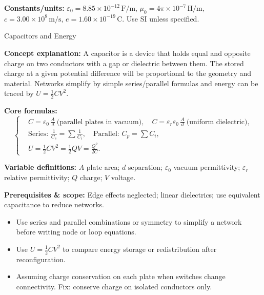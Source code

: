 \begin{insightbox}
\textbf{Constants/units:} $\varepsilon_0=8.85\times10^{-12}\,\mathrm{F/m}$, $\mu_0=4\pi\times10^{-7}\,\mathrm{H/m}$, $c=3.00\times10^8\,\mathrm{m/s}$, $e=1.60\times10^{-19}\,\mathrm{C}$. Use SI unless specified.
\end{insightbox}


\begin{KnowledgePoint}{Capacitors and Energy \Core}
  \KPFormulas
  \begin{formulabox}
  \textbf{Concept explanation:} A capacitor is a device that holds equal and opposite charge on two conductors with a gap or dielectric between them. The stored charge at a given potential difference will be proportional to the geometry and material. Networks simplify by simple series/parallel formulas and energy can be traced by $U=\tfrac12 C V^2$.

  \textbf{Core formulas:}
  \[
  \left\{\begin{aligned}
    &C=\varepsilon_0\,\frac{A}{d}\ \text{(parallel plates in vacuum)},\quad C=\varepsilon_r\varepsilon_0\,\frac{A}{d}\ \text{(uniform dielectric)},\\
    &\text{Series: } \frac{1}{C_s}=\sum \frac{1}{C_i},\quad \text{Parallel: } C_p=\sum C_i,\\
    &U=\tfrac12 C V^2=\tfrac12 QV=\frac{Q^2}{2C}.
  \end{aligned}\right.
  \]

  \textbf{Variable definitions:} $A$ plate area; $d$ separation; $\varepsilon_0$ vacuum permittivity; $\varepsilon_r$ relative permittivity; $Q$ charge; $V$ voltage.

  \textbf{Prerequisites \& scope:} Edge effects neglected; linear dielectrics; use equivalent capacitance to reduce networks.
  \end{formulabox}

  \KPHeuristics
  \begin{heuristicsbox}
  \begin{itemize}[leftmargin=*]
    \item Use series and parallel combinations or symmetry to simplify a network before writing node or loop equations.
    \item Use $U=\tfrac12 CV^2$ to compare energy storage or redistribution after reconfiguration.
  \end{itemize}
  \vspace{0.4em}
  \begin{itemize}[leftmargin=*]
    \item Assuming charge conservation on each plate when switches change connectivity. Fix: conserve charge on isolated conductors only.
  \end{itemize}
  \end{heuristicsbox}


\end{KnowledgePoint}
